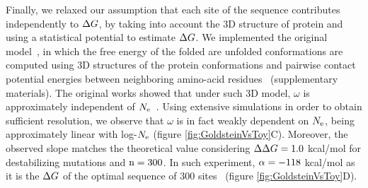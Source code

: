 Finally, we relaxed our assumption that each site of the sequence contributes independently to $\Delta G$, by taking into account the $3$D structure of protein and using a statistical potential to estimate $\Delta G$.
We implemented the original model~\citep{Williams2006, Goldstein2011, Pollock2012}, in which the free energy of the folded are unfolded conformations are computed using $3$D structures of the protein conformations and pairwise contact potential energies between neighboring amino-acid residues~\citep{Miyazawa1985} (supplementary materials).
The original works showed that under such $3$D model, $\omega$ is approximately independent of $N_{\mathrm{e}}$~\citep{Goldstein2013}.
Using extensive simulations in order to obtain sufficient resolution, we observe that $\omega$ is in fact weakly dependent on $N_{\mathrm{e}}$, being approximately linear with log-$N_{\mathrm{e}}$ (figure \ref{fig:GoldsteinVsToy}C).
Moreover, the observed slope matches the theoretical value considering $\Delta \Delta G = 1.0$ kcal/mol for destabilizing mutations and $\text{n}=300$. 
In such experiment, $\alpha=-118$ kcal/mol as it is the $\Delta G$ of the optimal sequence of $300$ sites~\citep{Goldstein2011} (figure \ref{fig:GoldsteinVsToy}D).
